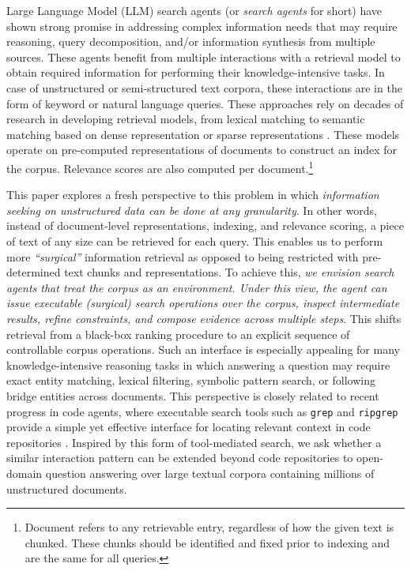 \documentclass{llmxive}
\begin{document}
Large Language Model (LLM) search agents (or \textit{search agents} for short) \citep{search-o1,search-r1} have shown strong promise in addressing complex information needs that may require reasoning, query decomposition, and/or information synthesis from multiple sources. These agents benefit from multiple interactions with a retrieval model to obtain required information for performing their knowledge-intensive tasks. In case of unstructured or semi-structured text corpora, these interactions are in the form of keyword or natural language queries. These approaches rely on decades of research in developing retrieval models, from lexical matching \citep{TFIDF,bm25,QL} to semantic matching based on dense representation \citep{LSI,karpukhin2020dense} or sparse representations \citep{SNRM,SPLADE}. These models operate on pre-computed representations of documents to construct an index for the corpus. Relevance scores are also computed per document.\footnote{Document refers to any retrievable entry, regardless of how the given text is chunked. These chunks should be identified and fixed prior to indexing and are the same for all queries.}

This paper explores a fresh perspective to this problem in which \textit{information seeking on unstructured data can be done at any granularity}. In other words, instead of document-level representations, indexing, and relevance scoring, a piece of text of any size can be retrieved for each query. This enables us to perform more \textit{``surgical''} information retrieval as opposed to being restricted with pre-determined text chunks and representations. 
To achieve this, \textit{we envision search agents that treat the corpus as an environment. Under this view, the agent can issue executable (surgical) search operations over the corpus, inspect intermediate results, refine constraints, and compose evidence across multiple steps}. This shifts retrieval from a black-box ranking procedure to an explicit sequence of controllable corpus operations. Such an interface is especially appealing for many knowledge-intensive reasoning tasks in which answering a question may require exact entity matching, lexical filtering, symbolic pattern search, or following bridge entities across documents. This perspective is closely related to recent progress in code agents, where executable search tools such as \texttt{grep} and \texttt{ripgrep} provide a simple yet effective interface for locating relevant context in code repositories \citep{wang2026grepragempiricalstudyoptimization}. Inspired by this form of tool-mediated search, we ask whether a similar interaction pattern can be extended beyond code repositories to open-domain question answering over large textual corpora containing millions of unstructured documents.
\end{document}
